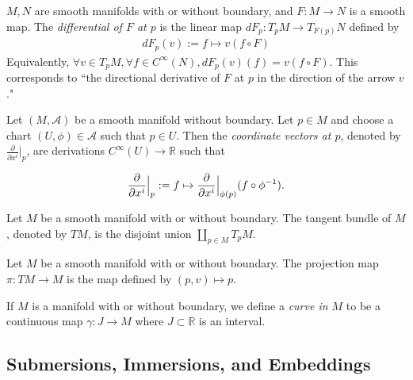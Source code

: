 \begin{defn}[Differential]
  $M, N$ are smooth manifolds with or without boundary, and $F: M \rightarrow N$ is a smooth map.
  The \textit{differential of $F$ at $p$} is the linear map $dF_p: T_pM \rightarrow T_{F(p)}N$ defined by 
  \begin{align*}
    dF_p(v) := f \mapsto v(f \circ F)
  \end{align*}
  Equivalently, $\forall v \in T_pM, \forall f \in C^{\infty}(N), dF_p(v)(f) = v(f \circ F)$.
  This corresponds to ``the directional derivative of $F$ at $p$ in the direction of the arrow $v$."
\end{defn}

\begin{defn}
  Let $(M, \mathcal{A})$ be a smooth manifold without boundary.
  Let $p \in M$ and choose a chart $(U, \phi) \in \mathcal{A}$ such that $p \in U$.
  Then the \textit{coordinate vectors at $p$}, denoted by $\frac{\partial}{\partial x^i}\vert_p$, are derivations $C^{\infty}(U) \rightarrow \mathbb{R}$ such that

  \begin{align*}
    \frac{\partial}{\partial x^i}\Big{\vert}_p := f \mapsto \frac{\partial}{\partial x^i}\Big{\vert}_{\phi(p)}(f \circ \phi^{-1}).
  \end{align*}
\end{defn}

\begin{defn}
  Let $M$ be a smooth manifold with or without boundary.
  The tangent bundle of $M$, denoted by $TM$, is the disjoint union $\coprod_{p \in M} T_pM$.
\end{defn}

\begin{defn}
  Let $M$ be a smooth manifold with or without boundary.
  The projection map $\pi: TM \rightarrow M$ is the map defined by $(p, v) \mapsto p$.
\end{defn}

\begin{defn}[Curve]
  If $M$ is a manifold with or without boundary, we define a \textit{curve in $M$} to be a continuous map $\gamma: J \rightarrow M$ where $J \subset \mathbb{R}$ is an interval.
\end{defn}

\subsection{Submersions, Immersions, and Embeddings}

